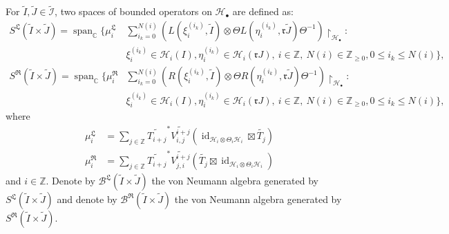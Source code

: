 \documentclass{article}
\newcommand{\hilb}{\mathcal{H}}
\newcommand{\B}{\mathcal{B}}
\newcommand{\C}{\mathbb{C}}
\newcommand{\Z}{\mathbb{Z}}
\begin{document}
For $\widetilde{I}, \widetilde{J} \in \widetilde{\mathcal{I}}$, two spaces of bounded operators on $\hilb_\bullet$ are defined as:
\begin{align*}
    S^{\mathfrak{L}}(\widetilde{I}\times\widetilde{J}) = \operatorname{span}_\C \bigg\{ \mu_i^{\mathfrak{L}} &\sum_{i_k=0}^{N(i)} \left(L(\xi_i^{(i_k)},\widetilde{I})\otimes \Theta L(\eta_i^{(i_k)},\mathfrak{r}\widetilde{J})\Theta^{-1}\right)\restriction_{\hilb_{\bullet}}: \\
    \  &\xi_i^{(i_k)}\in\hilb_i(I), \eta_i^{(i_k)}\in\hilb_i(\mathfrak{r}J), \ i\in\Z, 
     \ N(i)\in\Z_{\geq 0},0\leq i_k\leq N(i) \bigg\}, \\
  S^{\mathfrak{R}}(\widetilde{I}\times\widetilde{J}) = \operatorname{span}_\C \bigg\{ \mu_i^{\mathfrak{R}} &\sum_{i_k=0}^{N(i)} \left(R(\xi_i^{(i_k)},\widetilde{I})\otimes \Theta R(\eta_i^{(i_k)},\mathfrak{r}\widetilde{J})\Theta^{-1}\right)\restriction_{\hilb_{\bullet}}: \\
    \  &\xi_i^{(i_k)}\in\hilb_i(I), \eta_i^{(i_k)}\in\hilb_i(\mathfrak{r}J), \ i\in\Z, 
     \ N(i)\in\Z_{\geq 0},0\leq i_k\leq N(i) \bigg\},
\end{align*}
where 
\begin{align*}
    \mu_i^{\mathfrak{L}} &= \sum_{j\in\Z}\widetilde{T_{i+j}}^*\widetilde{V^{i+j}_{i,j}}(\operatorname{id}_{\hilb_i\otimes \Theta_i\hilb_i}\boxtimes \widetilde{T_j}) \\
    \mu_i^{\mathfrak{R}} &= \sum_{j\in\Z}\widetilde{T_{i+j}}^*\widetilde{V^{i+j}_{j,i}}(\widetilde{T_j}\boxtimes\operatorname{id}_{\hilb_i\otimes \Theta_i\hilb_i})
\end{align*}
and  $i \in\Z.$
Denote by $\B^{\mathfrak{L}}(\widetilde{I}\times \widetilde{J})$ the von Neumann algebra generated by $S^{\mathfrak{L}}(\widetilde{I}\times\widetilde{J})$ and denote by $\B^{\mathfrak{R}}(\widetilde{I}\times\widetilde{J})$ the von Neumann algebra generated by
$S^{\mathfrak{R}}(\widetilde{I}\times \widetilde{J}).$
\end{document}
